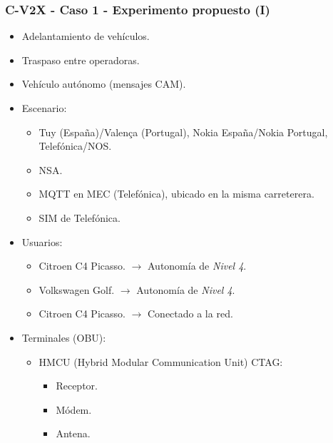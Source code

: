 \documentclass{beamer}
\begin{document}
%

\begin{frame}
\frametitle{C-V2X - Caso 1 - Experimento propuesto (I)}

\begin{itemize}
\item Adelantamiento de vehículos.
\item Traspaso entre operadoras.
\item Vehículo autónomo (mensajes CAM).
\item {
	Escenario:
	\begin{itemize}
	\item Tuy (España)/Valença (Portugal), Nokia España/Nokia Portugal, Telefónica/NOS.
	\item NSA.
	\item MQTT en MEC (Telefónica), ubicado en la misma carreterera.
	\item SIM de Telefónica.
	\end{itemize}
}
\item {
	Usuarios:
	\begin{itemize}
	\item Citroen C4 Picasso. $\rightarrow$ Autonomía de \textit{Nivel 4}.
	\item Volkswagen Golf. $\rightarrow$ Autonomía de \textit{Nivel 4}.
	\item Citroen C4 Picasso. $\rightarrow$ Conectado a la red.
	\end{itemize}
}
\item {
	Terminales (OBU):
	\begin{itemize}
	\item {
		HMCU (Hybrid Modular Communication Unit) CTAG:
		\begin{itemize}
		\item Receptor.
		\item Módem.
		\item Antena.
		\end{itemize}
	}
	\end{itemize}
}
\end{itemize}
\end{frame}
\end{document}
